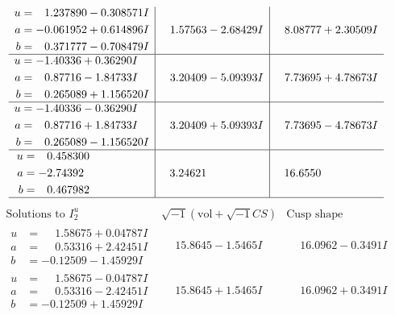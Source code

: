 \documentclass[1p]{elsarticle_modified}
\theoremstyle{definition}
\newcommand{\I}{\sqrt{-1}}
\begin{document}
$$\begin{array}{c|c|c}
\begin{aligned}
u &= \phantom{-}1.237890 - 0.308571 I \\
a &= -0.061952 + 0.614896 I \\
b &= \phantom{-}0.371777 - 0.708479 I\end{aligned}
 & \phantom{-}1.57563 - 2.68429 I & \phantom{-}8.08777 + 2.30509 I \\ \hline\begin{aligned}
u &= -1.40336 + 0.36290 I \\
a &= \phantom{-}0.87716 - 1.84733 I \\
b &= \phantom{-}0.265089 + 1.156520 I\end{aligned}
 & \phantom{-}3.20409 - 5.09393 I & \phantom{-}7.73695 + 4.78673 I \\ \hline\begin{aligned}
u &= -1.40336 - 0.36290 I \\
a &= \phantom{-}0.87716 + 1.84733 I \\
b &= \phantom{-}0.265089 - 1.156520 I\end{aligned}
 & \phantom{-}3.20409 + 5.09393 I & \phantom{-}7.73695 - 4.78673 I \\ \hline\begin{aligned}
u &= \phantom{-}0.458300\phantom{ +0.000000I} \\
a &= -2.74392\phantom{ +0.000000I} \\
b &= \phantom{-}0.467982\phantom{ +0.000000I}\end{aligned}
 & \phantom{-}3.24621\phantom{ +0.000000I} & \phantom{-}16.6550\phantom{ +0.000000I}\\
 \hline 
 \end{array}$$\newpage$$\begin{array}{c|c|c}  
\text{Solutions to }I^u_{2}& \I (\text{vol} + \sqrt{-1}CS) & \text{Cusp shape}\\
 \hline 
\begin{aligned}
u &= \phantom{-}1.58675 + 0.04787 I \\
a &= \phantom{-}0.53316 + 2.42451 I \\
b &= -0.12509 - 1.45929 I\end{aligned}
 & \phantom{-}15.8645 - 1.5465 I & \phantom{-}16.0962 - 0.3491 I \\ \hline\begin{aligned}
u &= \phantom{-}1.58675 - 0.04787 I \\
a &= \phantom{-}0.53316 - 2.42451 I \\
b &= -0.12509 + 1.45929 I\end{aligned}
 & \phantom{-}15.8645 + 1.5465 I & \phantom{-}16.0962 + 0.3491 I \\ \hline\begin{aligned}

\end{aligned}
\end{array}$$
\end{document}
